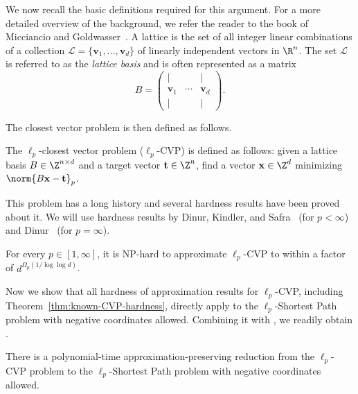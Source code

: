 \documentclass[11pt,a4paper]{article}
\begin{document}
We now recall the basic definitions required for this argument. For a more detailed overview of the background, we refer the reader to the book of Micciancio and Goldwasser~\cite{micciancio2002complexity}. A lattice is the set of all integer linear combinations of a collection $\mathcal{L} = \{\mathbf{v}_1, \dots , \mathbf{v}_d\}$ of linearly independent vectors in $\R^n$. The set $\mathcal{L}$ is referred to as the \emph{lattice basis} and is often represented as a matrix
\[
    B = \begin{pmatrix}
            | & &|\\
            \mathbf{v}_1& \cdots & \mathbf{v}_d\\
            | & &|
        \end{pmatrix}.
\]

The closest vector problem is then defined as follows.
\begin{definition}
    The $\ell_p$-closest vector problem ($\ell_p$-CVP) is defined as follows: given a lattice basis $B \in \Z^{n\times d}$ and a target vector $\mathbf{t} \in \Z^n$, find a vector $\mathbf{x} \in \Z^d$ minimizing $\norm{B\mathbf{x} - \mathbf{t}}_p$.
\end{definition}

This problem has a long history and several hardness results have been proved about it. We will use hardness results by Dinur, Kindler, and Safra~\cite{dinur2003approximating} (for $p < \infty$) and  Dinur~\cite{dinur2002approximating} (for $p=\infty$).
\begin{theorem}\label{thm:known-CVP-hardness}
    For every $p \in[1,\infty]$, it is \textnormal{NP}-hard to approximate $\ell_p$-CVP to within a factor of $d^{\Omega_p(1 / \log \log d)}$.
\end{theorem}

Now we show that all hardness of approximation results for $\ell_p$-CVP, including Theorem~\ref{thm:known-CVP-hardness}, directly apply to the $\ell_p$-Shortest Path problem with negative coordinates allowed.
Combining it with , we readily obtain
.

\begin{theorem}\label{thm:CVP-reduction}
    There is a polynomial-time approximation-preserving reduction from the $\ell_p$-CVP problem to the $\ell_p$-Shortest Path problem with negative coordinates allowed.
\end{theorem}
\end{document}
